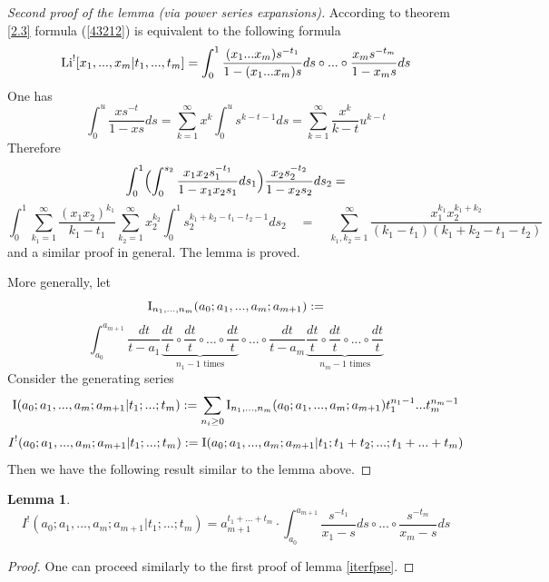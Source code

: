 \documentclass[10pt]{article}
\newtheorem{lemma}[theorem]{Lemma}
\begin{document}
\begin{proof}[Second proof of the lemma (via power series expansions)] According to theorem \ref{2.3} 
formula (\ref{43212}) is equivalent to  the following formula
$$
{\rm Li}^![x_1,...,x_m|t_1,...,t_m] = \int_0^1\frac{(x_1
  ...  x_m)  s^{-t_1}}{1-(x_1 
  ...  x_m)  s}ds \circ ... \circ \frac{x_m 
  s^{-t_m}}{1-x_m  s}ds
$$
One has
$$
\int_0^{u}\frac{x s^{-t}}{1-xs}ds = \sum_{k=1}^{\infty} x^k
\int_0^u s^{k-t-1}ds = \sum_{k=1}^{\infty} \frac{x^k}{k-t}u^{k-t}
$$
Therefore
$$
\int_0^1 \Bigl(\int_0^{s_2}\frac{x_1x_2 s_1^{-t_1}}{1-x_1x_2s_1}ds_1\Bigr)
\frac{x_2 s_2^{-t_2}}{1-x_2s_2}ds_2 = 
$$
$$
\int_0^1
\sum_{k_1=1}^{\infty}
\frac{(x_1x_2)^{k_1}}{k_1
  -t_1}\sum_{k_2=1}^{\infty}x_2^{k_2}\int_0^1s_2^{k_1 + k_2 - t_1
  - t_2 -1} ds_2 \quad = \quad 
\sum_{k_1,k_2=1}^{\infty}
\frac{x_1^{k_1}x_2^{k_1+k_2}}{(k_1-t_1)(k_1+k_2 - t_1 -t_2)}
$$
and a similar proof in general. 
The lemma is proved.

More generally, let 
$$
{\rm I}_{n_1, ..., n_m}(a_0; a_1, ..., a_m; a_{m+1}):= 
$$
\begin{equation} \label{ur4-8,1}
\int_{a_0}^{a_{m+1}} 
\frac{dt}{t-a_1}\underbrace{\frac{dt}{t} \circ \frac{dt}{t}\circ  ... \circ \frac{dt}{t}}_{\mbox{$n_1-1$ times}} \circ  ... \circ \frac{dt}{t-a_m}\underbrace{\frac{dt}{t} \circ \frac{dt}{t}\circ  ... \circ \frac{dt}{t}}_{\mbox{$n_m-1$ times}} 
\end{equation}
Consider the generating series
$$
{\rm I}(a_0; a_1, ..., a_m; a_{m+1}| t_1; ...; t_m) := \sum_{n_i \geq 0}{\rm I}_{n_1, ..., n_m}(a_0; a_1, ..., a_m; a_{m+1})t_1^{n_1-1} ... t_m^{n_m-1}
$$
$$
I^!(a_0; a_1, ..., a_m; a_{m+1}| t_1; ...; t_m) := {\rm I}(a_0; a_1, ..., a_m; a_{m+1}| t_1;
t_1 + t_2;  ...; t_1+...+t_m)
$$
Then we have the following result similar to the lemma above.


\end{proof}

\begin{lemma} \label{iterfpse*}
\begin{equation} \label{ur4-8,2}
I^!(a_0; a_1, ..., a_m; a_{m+1}| t_1; ...; t_m) = a_{m+1}^{t_1+ ... + t_m}\cdot 
\int_{a_0}^{a_{m+1}}\frac{ s^{-t_1}}{x_1 -
  s}ds \circ ... \circ \frac{s^{-t_m}}{x_m - s}ds
\end{equation}
\end{lemma}

\begin{proof}  One can proceed similarly to the first proof of lemma \ref{iterfpse}. 


\end{proof}
\end{document}
